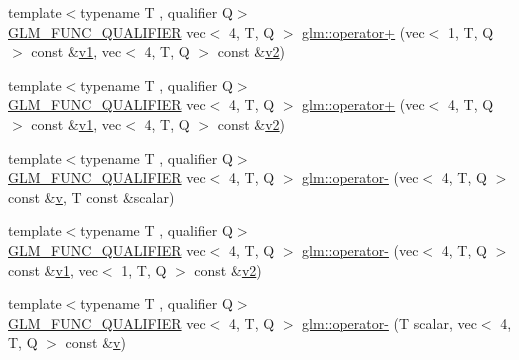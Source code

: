 \begin{DoxyCompactItemize}
\item 
{\footnotesize template$<$typename T , qualifier Q$>$ }\\\mbox{\hyperlink{setup_8hpp_a33fdea6f91c5f834105f7415e2a64407}{G\+L\+M\+\_\+\+F\+U\+N\+C\+\_\+\+Q\+U\+A\+L\+I\+F\+I\+ER}} vec$<$ 4, T, Q $>$ \mbox{\hyperlink{namespaceglm_a6eefd12da10fc4df72ed8e6e46636c11}{glm\+::operator+}} (vec$<$ 1, T, Q $>$ const \&\mbox{\hyperlink{_s_d_l__opengl__glext_8h_a435c176a02c061b43e19bdf7c86cceae}{v1}}, vec$<$ 4, T, Q $>$ const \&\mbox{\hyperlink{_s_d_l__opengl__glext_8h_a0928f6d0f0f794ba000a21dfae422136}{v2}})
\item 
{\footnotesize template$<$typename T , qualifier Q$>$ }\\\mbox{\hyperlink{setup_8hpp_a33fdea6f91c5f834105f7415e2a64407}{G\+L\+M\+\_\+\+F\+U\+N\+C\+\_\+\+Q\+U\+A\+L\+I\+F\+I\+ER}} vec$<$ 4, T, Q $>$ \mbox{\hyperlink{namespaceglm_a5c93cc99679b8841aaa4ed233ec0f567}{glm\+::operator+}} (vec$<$ 4, T, Q $>$ const \&\mbox{\hyperlink{_s_d_l__opengl__glext_8h_a435c176a02c061b43e19bdf7c86cceae}{v1}}, vec$<$ 4, T, Q $>$ const \&\mbox{\hyperlink{_s_d_l__opengl__glext_8h_a0928f6d0f0f794ba000a21dfae422136}{v2}})
\item 
{\footnotesize template$<$typename T , qualifier Q$>$ }\\\mbox{\hyperlink{setup_8hpp_a33fdea6f91c5f834105f7415e2a64407}{G\+L\+M\+\_\+\+F\+U\+N\+C\+\_\+\+Q\+U\+A\+L\+I\+F\+I\+ER}} vec$<$ 4, T, Q $>$ \mbox{\hyperlink{namespaceglm_a4e5903b4ed68f610438f19fc2349db90}{glm\+::operator-\/}} (vec$<$ 4, T, Q $>$ const \&\mbox{\hyperlink{_s_d_l__opengl_8h_a10a82eabcb59d2fcd74acee063775f90}{v}}, T const \&scalar)
\item 
{\footnotesize template$<$typename T , qualifier Q$>$ }\\\mbox{\hyperlink{setup_8hpp_a33fdea6f91c5f834105f7415e2a64407}{G\+L\+M\+\_\+\+F\+U\+N\+C\+\_\+\+Q\+U\+A\+L\+I\+F\+I\+ER}} vec$<$ 4, T, Q $>$ \mbox{\hyperlink{namespaceglm_a6a656f090e44b8c701219d9e6a08aeef}{glm\+::operator-\/}} (vec$<$ 4, T, Q $>$ const \&\mbox{\hyperlink{_s_d_l__opengl__glext_8h_a435c176a02c061b43e19bdf7c86cceae}{v1}}, vec$<$ 1, T, Q $>$ const \&\mbox{\hyperlink{_s_d_l__opengl__glext_8h_a0928f6d0f0f794ba000a21dfae422136}{v2}})
\item 
{\footnotesize template$<$typename T , qualifier Q$>$ }\\\mbox{\hyperlink{setup_8hpp_a33fdea6f91c5f834105f7415e2a64407}{G\+L\+M\+\_\+\+F\+U\+N\+C\+\_\+\+Q\+U\+A\+L\+I\+F\+I\+ER}} vec$<$ 4, T, Q $>$ \mbox{\hyperlink{namespaceglm_a86e7f7e7cafda50c4132527c92290df3}{glm\+::operator-\/}} (T scalar, vec$<$ 4, T, Q $>$ const \&\mbox{\hyperlink{_s_d_l__opengl_8h_a10a82eabcb59d2fcd74acee063775f90}{v}})

\end{DoxyCompactItemize}
